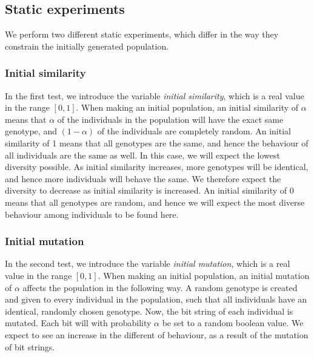 \subsection{Static experiments}
We perform two different static experiments, which differ in the way they constrain the initially generated population. 

\subsubsection{Initial similarity}
In the first test, we introduce the variable \emph{initial similarity}, which is a real value in the range $[0,1]$.
When making an initial population, an initial similarity of $\alpha$ means that $\alpha$ of the individuals in the population will have the exact same genotype, and $(1-\alpha)$ of the individuals are completely random.
An initial similarity of \num{1} means that all genotypes are the same, and hence the behaviour of all individuals are the same as well. In this case, we will expect the lowest diversity possible.
As initial similarity increases, more genotypes will be identical, and hence more individuals will behave the same.
We therefore expect the diversity to decrease as initial similarity is increased.
An initial similarity of \num{0} means that all genotypes are random, and hence we will expect the most diverse behaviour among individuals to be found here.

\subsubsection{Initial mutation}
In the second test, we introduce the variable \emph{initial mutation}, which is a real value in the range $[0,1]$.
When making an initial population, an initial mutation of $\alpha$ affects the population in the following way.
A random genotype is created and given to every individual in the population, such that all individuals have an identical, randomly chosen genotype.
Now, the bit string of each individual is mutated. Each bit will with probability $\alpha$ be set to a random boolean value. 
We expect to see an increase in the different of behaviour, as a result of the mutation of bit strings. 

